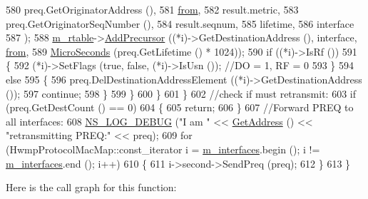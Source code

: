 \begin{DoxyCode}
580                 preq.GetOriginatorAddress (),
581                 \hyperlink{lte__amc_8m_a1b4c81ff74eb1a626b5ade44c81004b3}{from},
582                 result.metric,
583                 preq.GetOriginatorSeqNumber (),
584                 result.seqnum,
585                 lifetime,
586                 interface
587                 );
588               \hyperlink{classns3_1_1dot11s_1_1HwmpProtocol_a12fda0e3e5a400888c8ba1a87c1a7216}{m\_rtable}->\hyperlink{classns3_1_1dot11s_1_1HwmpRtable_ad867ab6ba437c2151907025750bf818b}{AddPrecursor} ((*i)->GetDestinationAddress (), interface, 
      \hyperlink{lte__amc_8m_a1b4c81ff74eb1a626b5ade44c81004b3}{from},
589                                       \hyperlink{group__timecivil_ga17465a639c8d1464e76538afdd78a9f0}{MicroSeconds} (preq.GetLifetime () * 1024));
590               \textcolor{keywordflow}{if} ((*i)->IsRf ())
591                 \{
592                   (*i)->SetFlags (\textcolor{keyword}{true}, \textcolor{keyword}{false}, (*i)->IsUsn ()); \textcolor{comment}{//DO = 1, RF = 0}
593                 \}
594               \textcolor{keywordflow}{else}
595                 \{
596                   preq.DelDestinationAddressElement ((*i)->GetDestinationAddress ());
597                   \textcolor{keywordflow}{continue};
598                 \}
599             \}
600         \}
601     \}
602   \textcolor{comment}{//check if must retransmit:}
603   \textcolor{keywordflow}{if} (preq.GetDestCount () == 0)
604     \{
605       \textcolor{keywordflow}{return};
606     \}
607   \textcolor{comment}{//Forward PREQ to all interfaces:}
608   \hyperlink{group__logging_ga413f1886406d49f59a6a0a89b77b4d0a}{NS\_LOG\_DEBUG} (\textcolor{stringliteral}{"I am "} << \hyperlink{classns3_1_1dot11s_1_1HwmpProtocol_ab8b2c6d98ae278406f543e25feca8ccc}{GetAddress} () << \textcolor{stringliteral}{"retransmitting PREQ:"} << preq);
609   \textcolor{keywordflow}{for} (HwmpProtocolMacMap::const\_iterator i = \hyperlink{classns3_1_1dot11s_1_1HwmpProtocol_ae2cee085d1d2b9d32b509b710c0b4511}{m\_interfaces}.begin (); i != 
      \hyperlink{classns3_1_1dot11s_1_1HwmpProtocol_ae2cee085d1d2b9d32b509b710c0b4511}{m\_interfaces}.end (); i++)
610     \{
611       i->second->SendPreq (preq);
612     \}
613 \}
\end{DoxyCode}


Here is the call graph for this function\+:


